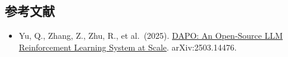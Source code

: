 \FloatBarrier
{}
\hypertarget{ux53c2ux8003ux6587ux732e-109}{%
\subsection{参考文献}\label{ux53c2ux8003ux6587ux732e-109}}

\vspace{0.25em}
\begin{itemize}
\tightlist
\item
  Yu, Q., Zhang, Z., Zhu, R., et al.~(2025). \href{https://arxiv.org/abs/2503.14476}{DAPO: An Open-Source LLM Reinforcement Learning System at Scale}. arXiv:2503.14476.
\end{itemize}

\clearpage
